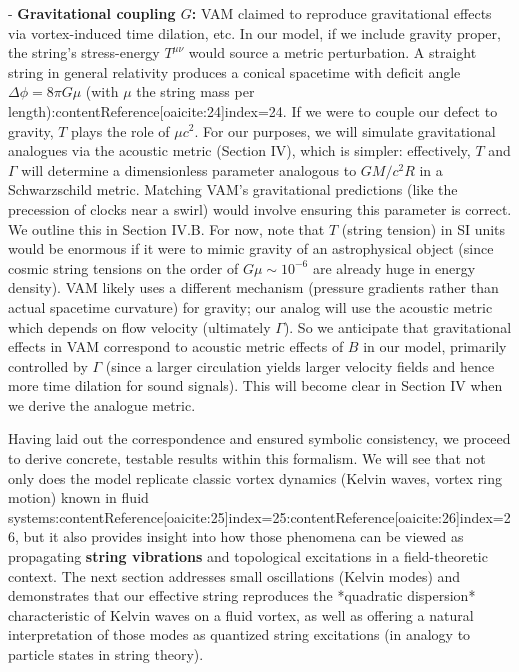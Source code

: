 \documentclass[12pt]{article}
\begin{document}
- \textbf{Gravitational coupling $G$:} VAM claimed to reproduce gravitational effects via vortex-induced time dilation, etc. In our model, if we include gravity proper, the string’s stress-energy $T^{\mu\nu}$ would source a metric perturbation. A straight string in general relativity produces a conical spacetime with deficit angle $ \Delta \phi = 8\pi G \mu$ (with $\mu$ the string mass per length):contentReference[oaicite:24]{index=24}. If we were to couple our defect to gravity, $T$ plays the role of $\mu c^2$. For our purposes, we will simulate gravitational analogues via the acoustic metric (Section IV), which is simpler: effectively, $T$ and $\Gamma$ will determine a dimensionless parameter analogous to $GM/c^2R$ in a Schwarzschild metric. Matching VAM’s gravitational predictions (like the precession of clocks near a swirl) would involve ensuring this parameter is correct. We outline this in Section IV.B. For now, note that $T$ (string tension) in SI units would be enormous if it were to mimic gravity of an astrophysical object (since cosmic string tensions on the order of $G\mu \sim 10^{-6}$ are already huge in energy density). VAM likely uses a different mechanism (pressure gradients rather than actual spacetime curvature) for gravity; our analog will use the acoustic metric which depends on flow velocity (ultimately $\Gamma$). So we anticipate that gravitational effects in VAM correspond to acoustic metric effects of $B$ in our model, primarily controlled by $\Gamma$ (since a larger circulation yields larger velocity fields and hence more time dilation for sound signals). This will become clear in Section IV when we derive the analogue metric.

Having laid out the correspondence and ensured symbolic consistency, we proceed to derive concrete, testable results within this formalism. We will see that not only does the model replicate classic vortex dynamics (Kelvin waves, vortex ring motion) known in fluid systems:contentReference[oaicite:25]{index=25}:contentReference[oaicite:26]{index=26}, but it also provides insight into how those phenomena can be viewed as propagating \textbf{string vibrations} and topological excitations in a field-theoretic context. The next section addresses small oscillations (Kelvin modes) and demonstrates that our effective string reproduces the *quadratic dispersion* characteristic of Kelvin waves on a fluid vortex, as well as offering a natural interpretation of those modes as quantized string excitations (in analogy to particle states in string theory).
\end{document}
